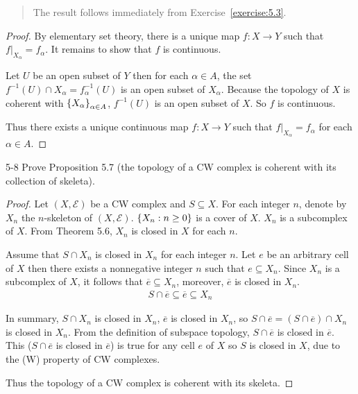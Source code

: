 \begin{quote}
	The result follows immediately from Exercise~\ref{exercise:5.3}.
\end{quote}

\begin{proof}
	By elementary set theory, there is a unique map $f: X \to Y$ such that $f\vert_{X_{\alpha}} = f_{\alpha}$. It remains to show that $f$ is continuous.

	Let $U$ be an open subset of $Y$ then for each $\alpha\in A$, the set $f^{-1}(U) \cap X_{\alpha} = f_{\alpha}^{-1}(U)$ is an open subset of $X_{\alpha}$. Because the topology of $X$ is coherent with $\left\{{X_{\alpha}}\right\}_{\alpha\in A}$, $f^{-1}(U)$ is an open subset of $X$. So $f$ is continuous.

	Thus there exists a unique continuous map $f: X\to Y$ such that $f\vert_{X_{\alpha}} = f_{\alpha}$ for each $\alpha\in A$.
\end{proof}

\begin{problem}{5-8}\label{problem:5-8}
Prove Proposition 5.7 (the topology of a CW complex is coherent with its
collection of skeleta).
\end{problem}

\begin{proof}
	Let $(X, \mathscr{E})$ be a CW complex and $S \subseteq X$. For each integer $n$, denote by $X_{n}$ the $n$-skeleton of $(X, \mathscr{E})$. $\left\{{ X_{n} : n\geq 0 }\right\}$ is a cover of $X$. $X_{n}$ is a subcomplex of $X$. From Theorem 5.6, $X_{n}$ is closed in $X$ for each $n$.

	Assume that $S \cap X_{n}$ is closed in $X_{n}$ for each integer $n$. Let $e$ be an arbitrary cell of $X$ then there exists a nonnegative integer $n$ such that $e \subseteq X_{n}$. Since $X_{n}$ is a subcomplex of $X$, it follows that $\overline{e} \subseteq X_{n}$, moreover, $\overline{e}$ is closed in $X_{n}$.
	\begin{align*}
		S \cap \overline{e} \subseteq \overline{e} \subseteq X_{n}
	\end{align*}

	In summary, $S\cap X_{n}$ is closed in $X_{n}$, $\overline{e}$ is closed in $X_{n}$, so $S\cap \overline{e} = (S\cap \overline{e}) \cap X_{n}$ is closed in $X_{n}$. From the definition of subspace topology, $S \cap \overline{e}$ is closed in $\overline{e}$. This ($S\cap \overline{e}$ is closed in $\overline{e}$) is true for any cell $e$ of $X$ so $S$ is closed in $X$, due to the (W) property of CW complexes.

	Thus the topology of a CW complex is coherent with its skeleta.
\end{proof}

